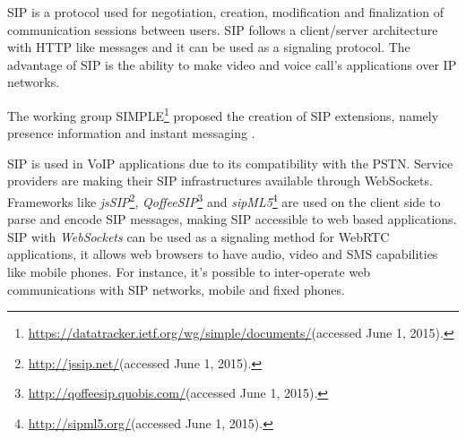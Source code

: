   \ac{SIP} \cite{rfc3261} is a protocol used for negotiation, creation, modification and finalization of communication sessions between users. \ac{SIP} follows a client/server architecture with \ac{HTTP} like messages and it can be used as a signaling protocol. The advantage of \ac{SIP} is the ability to make video and voice call's applications over \ac{IP} networks.

  The working group \ac{SIMPLE}\footnote{\url{https://datatracker.ietf.org/wg/simple/documents/}(accessed June 1, 2015).} proposed the creation of \ac{SIP} extensions, namely presence information \cite{rfc5263} and instant messaging \cite{rfc3428}.

  \ac{SIP} is used in \ac{VoIP} applications due to its compatibility with the \ac{PSTN}.
  Service providers are making their \ac{SIP} infrastructures available through WebSockets.
  Frameworks like \emph{jsSIP}\footnote{\url{http://jssip.net/}(accessed June 1, 2015).}, \emph{QoffeeSIP}\footnote{\url{http://qoffeesip.quobis.com/}(accessed June 1, 2015).} and \emph{sipML5}\footnote{\url{http://sipml5.org/}(accessed June 1, 2015).} are used on the client side to parse and encode \ac{SIP} messages, making \ac{SIP} accessible to web based applications. 
  \ac{SIP} with \emph{WebSockets} can be used as a signaling method for \ac{WebRTC} applications, it allows web browsers to have audio, video and \ac{SMS} capabilities like mobile phones. For instance, it's possible to inter-operate web communications with \ac{SIP} networks, mobile and fixed phones.

